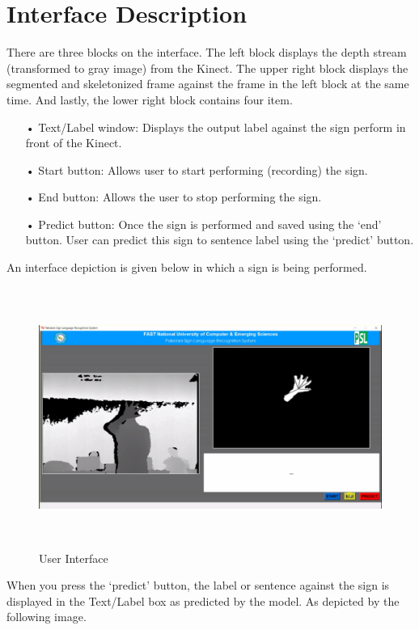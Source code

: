 \section{Interface Description}
There are three blocks on the interface. The left block displays the depth stream (transformed to gray image) from the Kinect. The upper right block displays the segmented and skeletonized frame against the frame in the left block at the same time. And lastly, the lower right block contains four item.\\
\begin{itemize}
	\item[•] Text/Label window: Displays the output label against the sign perform in front of the Kinect.
	\item[•]	Start button: Allows user to start performing (recording) the sign.
	\item[•]	End button: Allows the user to stop performing the sign.
	\item[•]	Predict button: Once the sign is performed and saved using the ‘end’ button. User can predict this sign to sentence label using the ‘predict’ button.
\end{itemize}
An interface depiction is given below in which a sign is being performed.

\begin{figure}[!htb]
	\begin{center}
		\includegraphics[height=8.5cm,width=12cm]{ThesisFigs/userinterface}
		\caption{User Interface}\label{fig:userinterface}
	\end{center}
\end{figure}
\clearpage
When you press the ‘predict’ button, the label or sentence against the sign is displayed in the Text/Label box as predicted by the model. As depicted by the following image.

